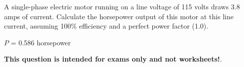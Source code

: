 

A single-phase electric motor running on a line voltage of 115 volts draws 3.8 amps of current.  Calculate the horsepower output of this motor at this line current, assuming 100\% efficiency and a perfect power factor (1.0).







$P$ = 0.586 horsepower







{\bf This question is intended for exams only and not worksheets!}.



